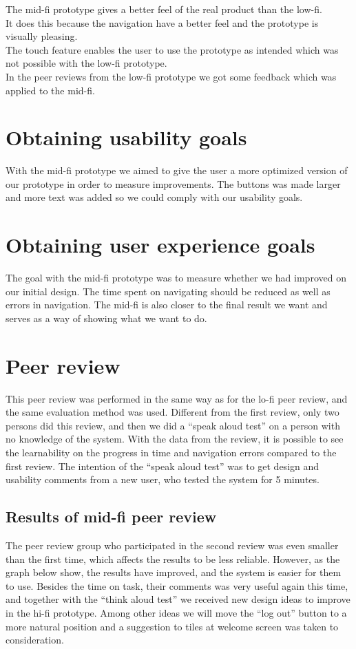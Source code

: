 The mid-fi prototype gives a better feel of the real product than the low-fi.\\
It does this because the navigation have a better feel and the prototype is visually pleasing.\\
The touch feature enables the user to use the prototype as intended which was not possible with the low-fi prototype.\\
In the peer reviews from the low-fi prototype we got some feedback which was applied to the mid-fi.\\

\section{Obtaining usability goals}
With the mid-fi prototype we aimed to give the user a more optimized version of our prototype in order to measure improvements. The buttons was made larger and more text was added so we could comply with our usability goals.

\section{Obtaining user experience goals}
The goal with the mid-fi prototype was to measure whether we had improved on our initial design. The time spent on navigating should be reduced as well as errors in navigation. The mid-fi is also closer to the final result we want and serves as a way of showing what we want to do.

\section{Peer review}
This peer review was performed in the same way as for the lo-fi peer review, and the same evaluation method was used. Different from the first review, only two persons did this review, and then we did a “speak aloud test” on a person with no knowledge of the system. With the data from the review, it is possible to see the learnability on the progress in time and navigation errors compared to the first review. The intention of the “speak aloud test” was to get design and usability comments from a new user, who tested the system for 5 minutes. \\
\subsection{Results of mid-fi peer review}
The peer review group who participated in the second review was even smaller than the first time, which affects the results to be less reliable. However, as the graph below show, the results have improved, and the system is easier for them to use. Besides the time on task, their comments was very useful again this time, and together with the “think aloud test” we received new design ideas to improve in the hi-fi prototype. Among other ideas we will move the “log out” button to a more natural position and a suggestion to tiles at welcome screen was taken to consideration. \\

